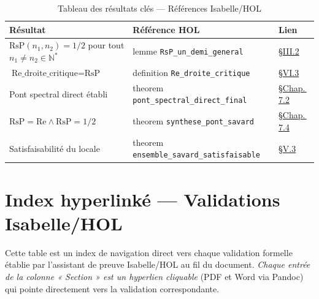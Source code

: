 \documentclass[11pt,a4paper]{article}
\begin{document}
\begin{table}[h]
\centering
\caption{Tableau des résultats clés --- Références Isabelle/HOL}
\begin{tabular}{p{5.5cm}p{4.5cm}p{2cm}}
\toprule
\textbf{Résultat} & \textbf{Référence HOL} & \textbf{Lien} \\
\midrule
$\text{RsP}(n_1, n_2) = 1/2$ pour tout $n_1 \neq n_2 \in \mathbb{N}^*$ & lemme \texttt{RsP\_un\_demi\_general} & \hyperref[hol:rsp_un_demi_general]{\S III.2} \\
$\text{Re\_droite\_critique} = \text{RsP}$ & definition \texttt{Re\_droite\_critique} & \hyperref[hol:re_droite_critique]{\S VI.3} \\
Pont spectral direct établi & theorem \texttt{pont\_spectral\_direct\_final} & \hyperref[hol:pont_direct_final]{\S Chap.\,7.2} \\
$\text{RsP} = \text{Re} \wedge \text{RsP} = 1/2$ & theorem \texttt{synthese\_pont\_savard} & \hyperref[hol:synthese_pont_savard]{\S Chap.\,7.4} \\
Satisfaisabilité du locale & theorem \texttt{ensemble\_savard\_satisfaisable} & \hyperref[hol:trois_piliers]{\S V.3} \\
\bottomrule
\end{tabular}
\end{table}

\newpage
\tableofcontents
\newpage

\section*{Index hyperlinké --- Validations Isabelle/HOL}
\label{sec:index_hol}

\noindent Cette table est un index de navigation direct vers chaque validation formelle établie par l'assistant de preuve Isabelle/HOL au fil du document. \emph{Chaque entrée de la colonne « Section » est un hyperlien cliquable} (PDF et Word via Pandoc) qui pointe directement vers la validation correspondante.
\end{document}
